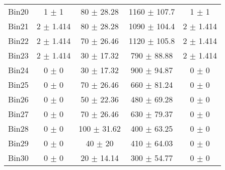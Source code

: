 \begin{tabular}{@{\extracolsep{4pt}}lcccc@{}}
     Bin20 & 1 $\pm$ 1 & 80 $\pm$ 28.28 & 1160 $\pm$ 107.7 & 1 $\pm$ 1 \\ 
     Bin21 & 2 $\pm$ 1.414 & 80 $\pm$ 28.28 & 1090 $\pm$ 104.4 & 2 $\pm$ 1.414 \\ 
     Bin22 & 2 $\pm$ 1.414 & 70 $\pm$ 26.46 & 1120 $\pm$ 105.8 & 2 $\pm$ 1.414 \\ 
     Bin23 & 2 $\pm$ 1.414 & 30 $\pm$ 17.32 & 790 $\pm$ 88.88 & 2 $\pm$ 1.414 \\ 
     Bin24 & 0 $\pm$ 0 & 30 $\pm$ 17.32 & 900 $\pm$ 94.87 & 0 $\pm$ 0 \\ 
     Bin25 & 0 $\pm$ 0 & 70 $\pm$ 26.46 & 660 $\pm$ 81.24 & 0 $\pm$ 0 \\ 
     Bin26 & 0 $\pm$ 0 & 50 $\pm$ 22.36 & 480 $\pm$ 69.28 & 0 $\pm$ 0 \\ 
     Bin27 & 0 $\pm$ 0 & 70 $\pm$ 26.46 & 630 $\pm$ 79.37 & 0 $\pm$ 0 \\ 
     Bin28 & 0 $\pm$ 0 & 100 $\pm$ 31.62 & 400 $\pm$ 63.25 & 0 $\pm$ 0 \\ 
     Bin29 & 0 $\pm$ 0 & 40 $\pm$ 20 & 410 $\pm$ 64.03 & 0 $\pm$ 0 \\ 
     Bin30 & 0 $\pm$ 0 & 20 $\pm$ 14.14 & 300 $\pm$ 54.77 & 0 $\pm$ 0 \\ 
\hline\hline
  \end{tabular}

